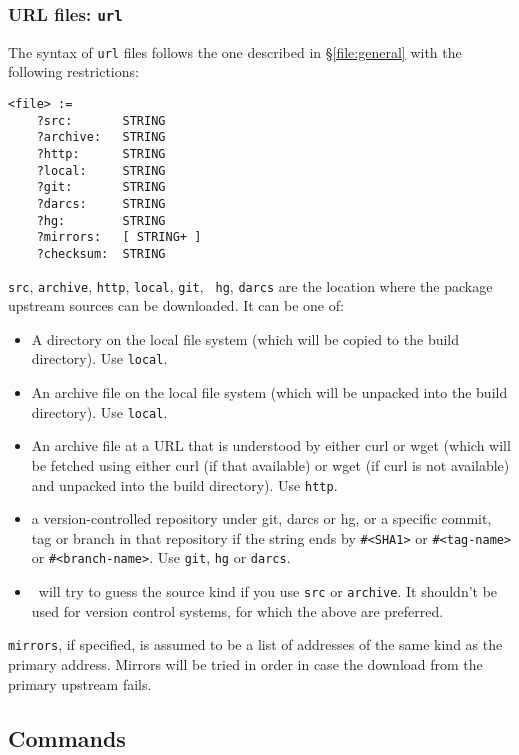 \documentclass[a4paper,10pt]{article}
\begin{document}
\subsubsection{URL files: {\tt url}}
\label{file:url}

The syntax of {\tt url} files follows the one described in
\S\ref{file:general} with the following restrictions:

{
\begin{Verbatim}[frame=single]
<file> :=
    ?src:       STRING
    ?archive:   STRING
    ?http:      STRING
    ?local:     STRING
    ?git:       STRING
    ?darcs:     STRING
    ?hg:        STRING
    ?mirrors:   [ STRING+ ]
    ?checksum:  STRING
\end{Verbatim}
}

{\tt src}, {\tt archive}, {\tt http}, {\tt local}, {\tt git}, {\tt
  hg}, {\tt darcs} are the location where the package upstream sources
can be downloaded. It can be one of:

\begin{itemize}
\item A directory on the local file system (which will be copied to
  the build directory). Use {\tt local}.
\item An archive file on the local file system (which will be unpacked
  into the build directory). Use {\tt local}.
\item An archive file at a URL that is understood by either curl or
  wget (which will be fetched using either curl (if that available) or
  wget (if curl is not available) and unpacked into the build
  directory). Use {\tt http}.
\item a version-controlled repository under git, darcs or
  hg, or a specific commit, tag or branch in that repository if
  the string ends by \verb+#<SHA1>+ or \verb+#<tag-name>+ or
  \verb+#<branch-name>+. Use {\tt git}, {\tt hg} or {\tt darcs}.
\item \OPAM\ will try to guess the source kind if you use {\tt src} or
  {\tt archive}. It shouldn't be used for version control systems, for
  which the above are preferred.
\end{itemize}

{\tt mirrors}, if specified, is assumed to be a list of addresses of the same
kind as the primary address. Mirrors will be tried in order in case the download
from the primary upstream fails.

\subsection{Commands}
\end{document}
